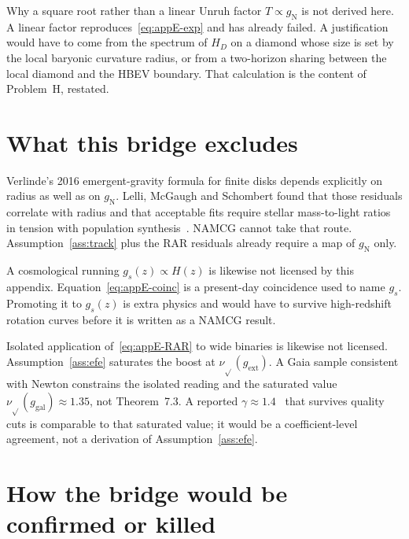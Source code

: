 Why a square root rather than a linear Unruh factor
\(T\propto g_{\mathrm{N}}\) is not derived here. A linear
factor reproduces~\eqref{eq:appE-exp} and has already failed.
A justification would have to come from the spectrum of
\(H_D\) on a diamond whose size is set by the local
baryonic curvature radius, or from a two-horizon sharing
between the local diamond and the HBEV boundary. That
calculation is the content of Problem~H, restated.

\section{What this bridge excludes}
\label{sec:appE-exclude}

Verlinde's 2016 emergent-gravity formula for finite disks
depends explicitly on radius as well as on \(g_{\mathrm{N}}\).
Lelli, McGaugh and Schombert found that those residuals
correlate with radius and that acceptable fits require
stellar mass-to-light ratios in tension with population
synthesis~\cite{Lelli2017Verlinde}. NAMCG cannot take that
route. Assumption~\ref{ass:track} plus the RAR residuals
already require a map of \(g_{\mathrm{N}}\) only.

A cosmological running \(g_s(z)\propto H(z)\) is likewise
not licensed by this appendix. Equation~\eqref{eq:appE-coinc}
is a present-day coincidence used to name \(g_s\). Promoting
it to \(g_s(z)\) is extra physics and would have to survive
high-redshift rotation curves before it is written as a
NAMCG result.

Isolated application of~\eqref{eq:appE-RAR} to wide binaries is
likewise not licensed. Assumption~\ref{ass:efe} saturates the boost at
\(\nu_{\sqrt{}}(g_{\mathrm{ext}})\). A Gaia sample consistent with
Newton constrains the isolated reading and the saturated value
\(\nu_{\sqrt{}}(g_{\mathrm{gal}})\approx 1.35\), not Theorem~7.3.
A reported \(\gamma\approx 1.4\)~\cite{Chae2023WideBinaries} that
survives quality cuts is comparable to that saturated value; it would
be a coefficient-level agreement, not a derivation of
Assumption~\ref{ass:efe}.

\section{How the bridge would be confirmed or killed}
\label{sec:appE-test}

